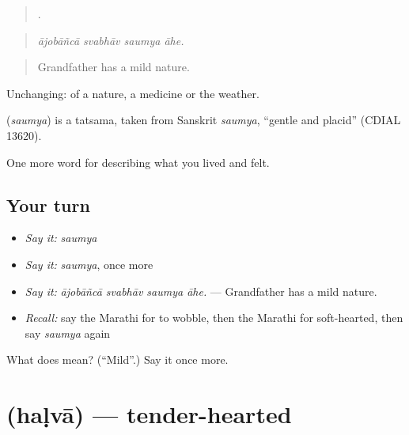 \begin{quote}
   .
\end{quote}

\begin{quote}
\emph{ājobāñcā svabhāv saumya āhe.}
\end{quote}

\begin{quote}
Grandfather has a mild nature.
\end{quote}

Unchanging: of a nature, a medicine or the weather.

\begin{cousinweb}
\textbf{} (\emph{saumya}) is a tatsama, taken from Sanskrit \emph{saumya}, \textquotedblleft{}gentle and placid\textquotedblright{} (CDIAL 13620).
\end{cousinweb}

\begin{grammarlens}[title={What you've built}]
One more word for describing what you lived and felt.
\end{grammarlens}

\subsection*{Your turn}
\begin{itemize}
\raggedright
  \item \emph{Say it:} \emph{saumya}
  \item \emph{Say it:} \emph{saumya}, once more
  \item \emph{Say it:} \emph{ājobāñcā svabhāv saumya āhe.} — Grandfather has a mild nature.
  \item \emph{Recall:} say the Marathi for to wobble, then the Marathi for soft-hearted, then say \emph{saumya} again
\end{itemize}

\begin{tcolorbox}[breakable,colback=teal!4,colframe=teal!35!black,title={Before you move on}]
What does  mean? (\textquotedblleft{}Mild\textquotedblright{}.) Say it once more.
\end{tcolorbox}
\section[\texorpdfstring{\mr{हळवा} (haḷvā)}{हळवा (haḷvā)}]{ (haḷvā) — tender-hearted}

\label{lesson:MR-C468-halva}



